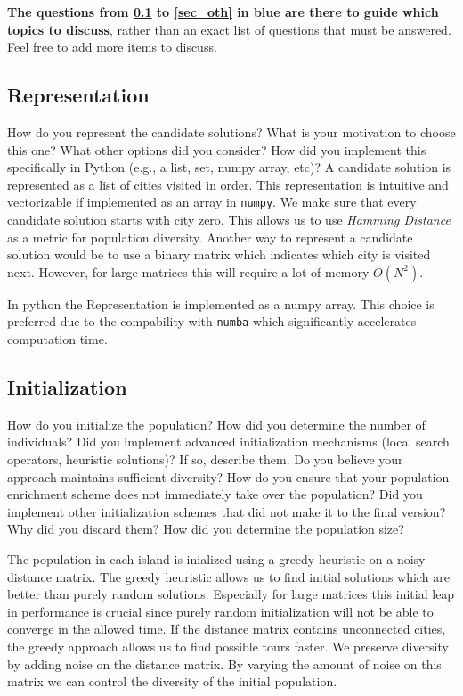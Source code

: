 \documentclass[a4paper,10pt]{article}
\newcommand{\ReplaceMe}[1]{{\color{blue}#1}}
\newcommand{\RemoveMe}[1]{{\color{purple}#1}}
\begin{document}
\RemoveMe{\textbf{The questions from \ref{sec_rep} to \ref{sec_oth} in blue are there to guide which topics to discuss}, rather than an exact list of questions that must be answered. Feel free to add more items to discuss.}

\subsection{Representation}\label{sec_rep}
\ReplaceMe{How do you represent the candidate solutions? What is your motivation to choose this one? What other options did you consider? How did you implement this specifically in Python (e.g., a list, set, numpy array, etc)?}
A candidate solution is represented as a list of cities visited in order. This representation is intuitive and vectorizable if implemented as an array in \texttt{numpy}.
We make sure that every candidate solution starts with city zero. This allows us to use \textit{Hamming Distance} as a metric for population diversity.
Another way to represent a candidate solution would be to use a binary matrix which indicates which city is visited next. However, for large matrices this will require a lot of memory $O(N^2)$.

\noindent
In python the Representation is implemented as a numpy array. This choice is preferred due to the compability with \texttt{numba} which significantly accelerates computation time.


\subsection{Initialization}
\ReplaceMe{How do you initialize the population? How did you determine the number of individuals? Did you implement advanced initialization mechanisms (local search operators, heuristic solutions)? If so, describe them. Do you believe your approach maintains sufficient diversity? How do you ensure that your population enrichment scheme does not immediately take over the population? Did you implement other initialization schemes that did not make it to the final version? Why did you discard them? How did you determine the population size?}

\noindent
The population in each island is inialized using a greedy heuristic on a noisy distance matrix. The greedy heuristic allows us to find initial solutions which are better than purely random solutions. Especially for large matrices this initial leap in performance is crucial since purely random initialization will not be able to converge in the allowed time.
If the distance matrix contains unconnected cities, the greedy approach allows us to find possible tours faster.
We preserve diversity by adding noise on the distance matrix. By varying the amount of noise on this matrix we can control the diversity of the initial population.
\end{document}
